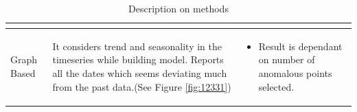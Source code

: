 \documentclass[a4paper,10pt]{article}
\begin{document}
\begin{table}[H]
{\begin{tabular}{|L{3cm} | L{5cm} | L{8cm}|}
\begin{itemize}
                                                                                                                                                                                                                                                                                                                 \end{itemize}                                                                                                                                                                                                                                                                                                                                                \\ \hline
Graph Based                           & It considers trend and seasonality in the timeseries while building model. Reports all the dates which seems deviating much from the past data.(See Figure \ref{fig:12331})                                                                                                     & \begin{itemize}
                                                                                                                                                                                                                                                                                                                  \item Result is dependant on number of anomalous points selected. 
                                                                                                                                                                                                                                                                                                                 \end{itemize}                                                                                                                                                                                                                                                                                                                              \\ \hline
	\end{tabular}}
	\caption{Description on methods}
	\label{table:MethodDescription}
\end{table}
\end{document}
